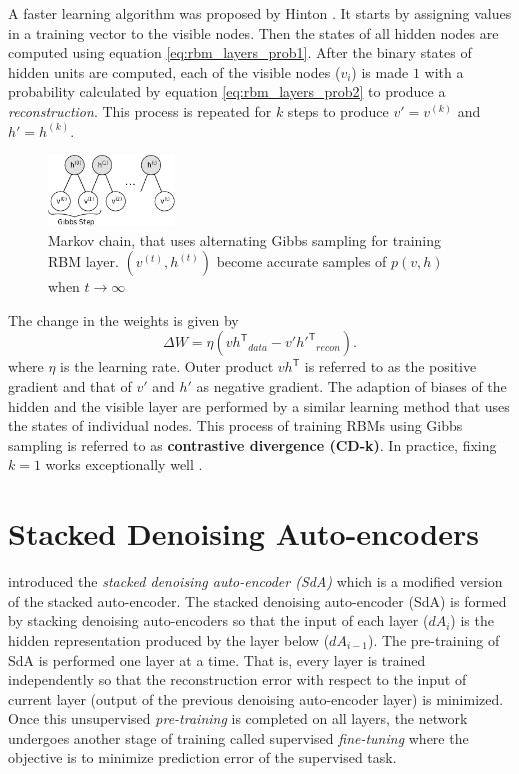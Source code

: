 A faster learning algorithm was proposed by Hinton \cite{hinton2002training,hinton2006reducing,hinton2010practical}. It starts by assigning values in a training vector to the visible nodes. Then the states of all hidden nodes are computed using equation \ref{eq:rbm_layers_prob1}. After the binary states of hidden units are computed, each of the visible nodes ($v_i$) is made $1$ with a probability calculated by equation \ref{eq:rbm_layers_prob2} to produce a \textit{reconstruction}. This process is repeated for $k$ steps to produce $v'= v^{(k)}$ and $h' = h^{(k)}$. 

\begin{figure}[ht]
\centering
\includegraphics[width=0.3\textwidth]{./imgs/markov_chain.png}
\caption[Markov chain of training RBM layer]{Markov chain, that uses alternating Gibbs sampling for training RBM layer. $(v^{(t)}, h^{(t)})$ become accurate samples of $p(v,h)$ when $t \rightarrow \infty$}
\label{fig:rbmmarkovChain}
\end{figure}

The change in the weights is given by
$$ \Delta W = \eta ({vh^\mathsf{T}}_{data} - {v'h'^{\mathsf{T}}}_{recon}). $$
where $\eta$ is the learning rate. Outer product $vh^\mathsf{T}$ is referred to as the positive gradient and that of $v'$ and $h'$ as negative gradient. The adaption of biases of the hidden and the visible layer are performed by a similar learning method that uses the states of individual nodes. This process of training RBMs using Gibbs sampling is referred to as \textbf{contrastive divergence (CD-k)}. In practice, fixing $k=1$ works exceptionally well \cite{hinton2010practical}.

\section{Stacked Denoising Auto-encoders}
\citet{vincent2010stacked} introduced the \emph{stacked denoising auto-encoder (SdA)} which is a modified version of the stacked auto-encoder. The stacked denoising auto-encoder (SdA) is formed by stacking denoising auto-encoders so that the input of each layer ($dA_i$) is the hidden representation produced by the layer below ($dA_{i-1}$). The pre-training of SdA is performed one layer at a time. That is, every layer is trained independently so that the reconstruction error with respect to the input of current layer (output of the previous denoising auto-encoder layer) is minimized. Once this unsupervised \textit{pre-training} is completed on all layers, the network undergoes another stage of training called supervised \textit{fine-tuning} where the objective is to minimize prediction error of the supervised task.

